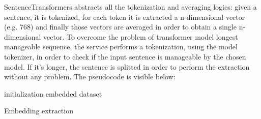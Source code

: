\documentclass[\main/main.tex]{subfiles}
\begin{document}
SentenceTransformers abstracts all the tokenization and averaging logics: given a sentence, it is tokenized, for each token it is extracted a n-dimensional vector (e.g. 768) and finally those vectors are averaged in order to obtain a single n-dimensional vector. To overcome the problem of transformer model longest manageable sequence, the service performs a tokenization, using the model tokenizer, in order to check if the input sentence is manageable by the chosen model. If it's longer, the sentence is splitted in order to perform the extraction without any problem. The pseudocode is visible below:
\begin{center}
    \begin{algorithm}[H]
     initialization
     \Return embedded dataset
     \caption{Embedding extraction}
    \end{algorithm}
\end{center}
\end{document}
